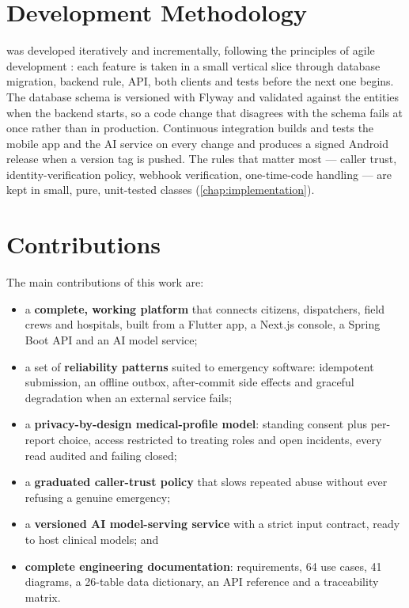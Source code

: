 \section{Development Methodology}

\ProjectName{} was developed iteratively and incrementally, following the principles of agile development
\cite{beck2001agile}: each feature is taken in a small vertical slice through database migration, backend rule,
API, both clients and tests before the next one begins. The database schema is versioned with Flyway and validated
against the entities when the backend starts, so a code change that disagrees with the schema fails at once rather
than in production. Continuous integration builds and tests the mobile app and the AI service on every change and
produces a signed Android release when a version tag is pushed. The rules that matter most --- caller trust,
identity-verification policy, webhook verification, one-time-code handling --- are kept in small, pure, unit-tested
classes (\cref{chap:implementation}).

\section{Contributions}

The main contributions of this work are:

\begin{itemize}
  \item a \textbf{complete, working platform} that connects citizens, dispatchers, field crews and hospitals, built
        from a Flutter app, a Next.js console, a Spring Boot API and an AI model service;
  \item a set of \textbf{reliability patterns} suited to emergency software: idempotent submission, an offline outbox,
        after-commit side effects and graceful degradation when an external service fails;
  \item a \textbf{privacy-by-design medical-profile model}: standing consent plus per-report choice, access restricted to
        treating roles and open incidents, every read audited and failing closed;
  \item a \textbf{graduated caller-trust policy} that slows repeated abuse without ever refusing a genuine emergency;
  \item a \textbf{versioned AI model-serving service} with a strict input contract, ready to host clinical models; and
  \item \textbf{complete engineering documentation}: requirements, 64 use cases, 41 diagrams, a 26-table data
        dictionary, an API reference and a traceability matrix.
\end{itemize}

